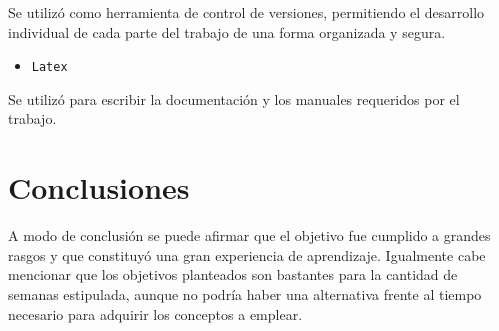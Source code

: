 \documentclass[a4paper]{article}
\begin{document}
Se utilizó como herramienta de control de versiones, permitiendo el desarrollo individual de cada parte del trabajo de una forma organizada y segura.

\begin{itemize}
	\item \texttt{Latex} 
\end{itemize} 

Se utilizó para escribir la documentación y los manuales requeridos por el trabajo.

\section{Conclusiones}

A modo de conclusión se puede afirmar que el objetivo fue cumplido a grandes rasgos y que constituyó una gran experiencia de aprendizaje. Igualmente cabe mencionar que los objetivos planteados son bastantes para la cantidad de semanas estipulada, aunque no podría haber una alternativa frente al tiempo necesario para adquirir los conceptos a emplear.
\end{document}
